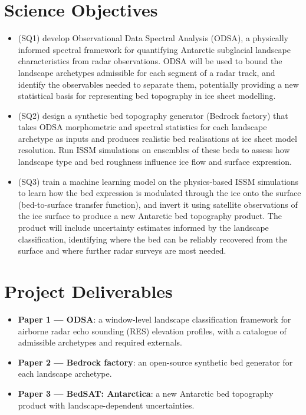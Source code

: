 \section{Science Objectives}
\begin{itemize}
\item{(SQ1)} develop Observational Data Spectral Analysis (ODSA), a physically informed spectral framework for quantifying Antarctic subglacial landscape characteristics from radar observations. ODSA will be used to bound the landscape archetypes admissible for each segment of a radar track, and identify the observables needed to separate them, potentially providing a new statistical basis for representing bed topography in ice sheet modelling.
\item{(SQ2)} design a synthetic bed topography generator (Bedrock factory) that takes ODSA morphometric and spectral statistics for each landscape archetype as inputs and produces realistic bed realisations at ice sheet model resolution. Run ISSM simulations on ensembles of these beds to assess how landscape type and bed roughness influence ice flow and surface expression.
\item{(SQ3)} train a machine learning model on the physics-based ISSM simulations to learn how the bed expression is modulated through the ice onto the surface (bed-to-surface transfer function), and invert it using satellite observations of the ice surface to produce a new Antarctic bed topography product. The product will include uncertainty estimates informed by the landscape classification, identifying where the bed can be reliably recovered from the surface and where further radar surveys are most needed.
\end{itemize}

\section{Project Deliverables}
\begin{itemize}
    \item\textbf{Paper 1 — ODSA}: a window-level landscape classification framework for airborne radar echo sounding (RES) elevation profiles, with a catalogue of admissible archetypes and required externals.
    \item\textbf{Paper 2 — Bedrock factory}: an open-source synthetic bed generator for each landscape archetype. 
    \item\textbf{Paper 3 — BedSAT: Antarctica}: a new Antarctic bed topography product with landscape-dependent uncertainties.
\end{itemize}